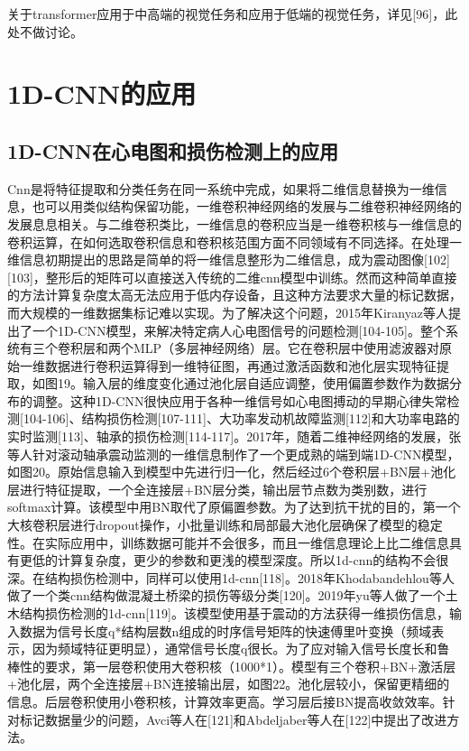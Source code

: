 \documentclass[15pt]{article}
\begin{document}
关于transformer应用于中高端的视觉任务和应用于低端的视觉任务，详见[96]，此处不做讨论。

\section{1D-CNN的应用}
\subsection{1D-CNN在心电图和损伤检测上的应用}

Cnn是将特征提取和分类任务在同一系统中完成，如果将二维信息替换为一维信息，也可以用类似结构保留功能，一维卷积神经网络的发展与二维卷积神经网络的发展息息相关。与二维卷积类比，一维信息的卷积应当是一维卷积核与一维信息的卷积运算，在如何选取卷积信息和卷积核范围方面不同领域有不同选择。在处理一维信息初期提出的思路是简单的将一维信息整形为二维信息，成为震动图像[102][103]，整形后的矩阵可以直接送入传统的二维cnn模型中训练。然而这种简单直接的方法计算复杂度太高无法应用于低内存设备，且这种方法要求大量的标记数据，而大规模的一维数据集标记难以实现。为了解决这个问题，2015年Kiranyaz等人提出了一个1D-CNN模型，来解决特定病人心电图信号的问题检测[104-105]。整个系统有三个卷积层和两个MLP（多层神经网络）层。它在卷积层中使用滤波器对原始一维数据进行卷积运算得到一维特征图，再通过激活函数和池化层实现特征提取，如图19。输入层的维度变化通过池化层自适应调整，使用偏置参数作为数据分布的调整。这种1D-CNN很快应用于各种一维信号如心电图搏动的早期心律失常检测[104-106]、结构损伤检测[107-111]、大功率发动机故障监测[112]和大功率电路的实时监测[113]、轴承的损伤检测[114-117]。2017年，随着二维神经网络的发展，张等人针对滚动轴承震动监测的一维信息制作了一个更成熟的端到端1D-CNN模型，如图20。原始信息输入到模型中先进行归一化，然后经过6个卷积层+BN层+池化层进行特征提取，一个全连接层+BN层分类，输出层节点数为类别数，进行softmax计算。该模型中用BN取代了原偏置参数。为了达到抗干扰的目的，第一个大核卷积层进行dropout操作，小批量训练和局部最大池化层确保了模型的稳定性。在实际应用中，训练数据可能并不会很多，而且一维信息理论上比二维信息具有更低的计算复杂度，更少的参数和更浅的模型深度。所以1d-cnn的结构不会很深。在结构损伤检测中，同样可以使用1d-cnn[118]。2018年Khodabandehlou等人做了一个类cnn结构做混凝土桥梁的损伤等级分类[120]。2019年yu等人做了一个土木结构损伤检测的1d-cnn[119]。该模型使用基于震动的方法获得一维损伤信息，输入数据为信号长度q*结构层数n组成的时序信号矩阵的快速傅里叶变换（频域表示，因为频域特征更明显），通常信号长度q很长。为了应对输入信号长度长和鲁棒性的要求，第一层卷积使用大卷积核（1000*1）。模型有三个卷积+BN+激活层+池化层，两个全连接层+BN连接输出层，如图22。池化层较小，保留更精细的信息。后层卷积使用小卷积核，计算效率更高。学习层后接BN提高收敛效率。针对标记数据量少的问题，Avci等人在[121]和Abdeljaber等人在[122]中提出了改进方法。
\end{document}
